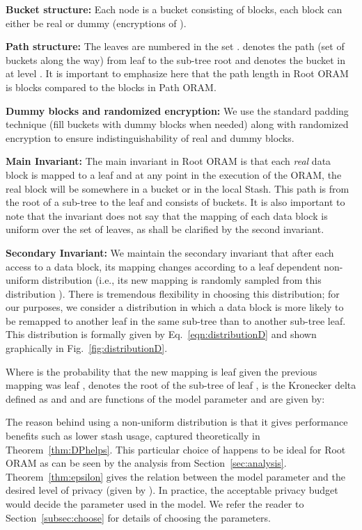 \documentclass[USenglish,oneside,twocolumn]{article}
\makeatletter
\newcommand{\ourprotocol}{Root ORAM}
\let\origsubsection\subsection
\renewcommand\subsection{\@ifstar{\starsubsection}{\nostarsubsection}}
\newcommand\nostarsubsection[1]
{\subsectionprelude\origsubsection{#1}\subsectionpostlude}
\newcommand\starsubsection[1]
{\subsectionprelude\origsubsection*{#1}\subsectionpostlude}
\newcommand\subsectionprelude{\vspace{-1.5em}}
\newcommand\subsectionpostlude{\vspace{-1em}}
\makeatother
\begin{document}
\textbf{Bucket structure: }Each node is a bucket consisting of  blocks, each block can either be real or dummy (encryptions of ). 

\textbf{Path structure: }The leaves are numbered in the set .  denotes the path (set of buckets along the way) from leaf  to the sub-tree root and  denotes the bucket in  at level . It is important to emphasize here that the path length in \ourprotocol{} is  blocks compared to the  blocks in Path ORAM.

\textbf{Dummy blocks and randomized encryption: }We use the standard padding technique (fill buckets with dummy blocks when needed) along with randomized encryption to ensure indistinguishability of real and dummy blocks.




\subsection{Invariants of the scheme}\label{subsec:updatemapping}
\textbf{Main Invariant: }The main invariant in \ourprotocol{} is that each \textit{real} data block  is mapped to a leaf  and at any point in the execution of the ORAM, the real block will be somewhere in a bucket  or in the local Stash. This path is from the root of a sub-tree to the leaf  and consists of  buckets. It is also important to note that the invariant does not say that the mapping of each data block is uniform over the set of leaves, as shall be clarified by the second invariant.

\textbf{Secondary Invariant: }We maintain the secondary invariant that after each access to a data block, its mapping changes according to a leaf dependent non-uniform distribution  (i.e., its new mapping is randomly sampled from this distribution ). There is tremendous flexibility in choosing this distribution; for our purposes, we consider a distribution in which a data block is more likely to be remapped to another leaf in the same sub-tree than to another sub-tree leaf. This distribution  is formally given by Eq.~\ref{eqn:distributionD} and shown graphically in Fig.~\ref{fig:distributionD}.

Where  is the probability that the new mapping is leaf  given the previous mapping was leaf ,  denotes the root of the sub-tree of leaf ,  is the Kronecker delta defined as
 and  and  are functions of the model parameter  and are given by: 


The reason behind using a non-uniform distribution is that it gives performance benefits such as lower stash usage, captured theoretically in Theorem~\ref{thm:DPhelps}. This particular choice of  happens to be ideal for \ourprotocol{} as can be seen by the analysis from Section~\ref{sec:analysis}. Theorem~\ref{thm:epsilon} gives the relation between the model parameter  and the desired level of privacy (given by ). In practice, the acceptable privacy budget  would decide the parameter  used in the model. We refer the reader to Section~\ref{subsec:choose} for details of choosing the parameters. 
\end{document}
